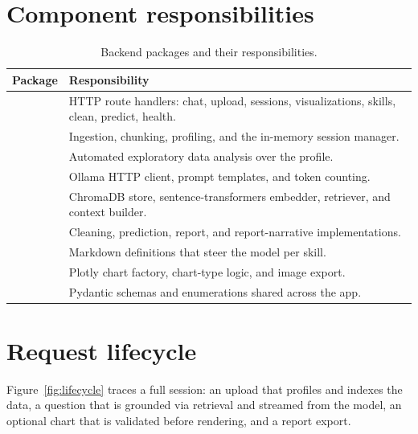 \section{Component responsibilities}
\begin{table}[h]
\centering
\caption{Backend packages and their responsibilities.}
\small
\begin{tabularx}{\linewidth}{@{}L{3.2cm} X@{}}
\toprule
\textbf{Package} & \textbf{Responsibility} \\
\midrule
{} & HTTP route handlers: chat, upload, sessions, visualizations,
skills, clean, predict, health. \\
 & Ingestion, chunking, profiling, and the in-memory session
manager. \\
 & Automated exploratory data analysis over the profile. \\
 & Ollama HTTP client, prompt templates, and token counting. \\
 & ChromaDB store, sentence-transformers embedder, retriever, and
context builder. \\
 & Cleaning, prediction, report, and report-narrative
implementations. \\
 & Markdown definitions that steer the model per
skill. \\
 & Plotly chart factory, chart-type logic, and image
export. \\
 & Pydantic schemas and enumerations shared across the app. \\
\bottomrule
\end{tabularx}
\end{table}

\section{Request lifecycle}
Figure~\ref{fig:lifecycle} traces a full session: an upload that profiles and
indexes the data, a question that is grounded via retrieval and streamed from
the model, an optional chart that is validated before rendering, and a report
export.

